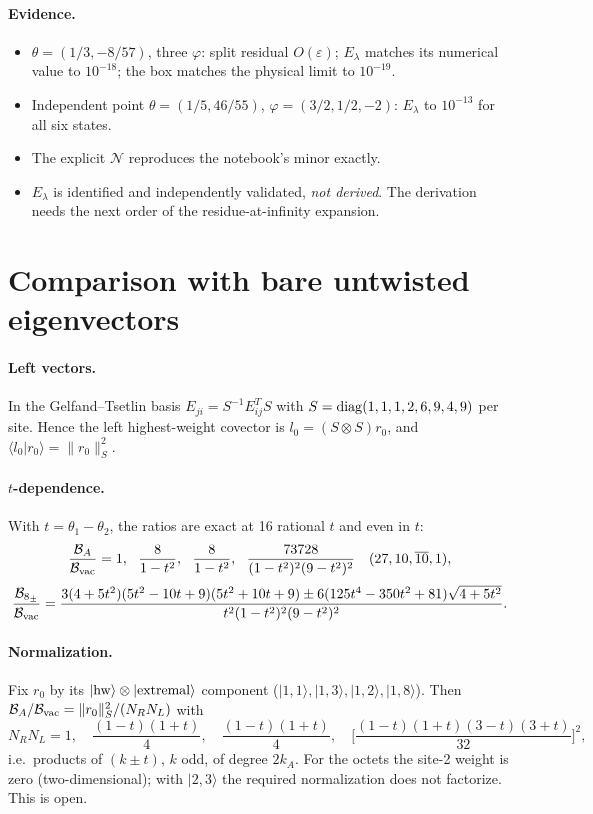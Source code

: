 \documentclass[11pt]{article}
\newcommand{\eps}{\varepsilon}
\newcommand{\vac}{{\rm vac}}
\begin{document}
\paragraph{Evidence.}
\begin{itemize}
\item $\theta=(1/3,-8/57)$, three $\varphi$: split residual $O(\eps)$; $E_\lambda$ matches its numerical value to $10^{-18}$; the box matches the physical limit to $10^{-19}$.
\item Independent point $\theta=(1/5,46/55)$, $\varphi=(3/2,1/2,-2)$: $E_\lambda$ to $10^{-13}$ for all six states.
\item The explicit $\mathcal N$ reproduces the notebook's minor exactly.
\item $E_\lambda$ is identified and independently validated, \emph{not derived}. The derivation needs the next order of the residue-at-infinity expansion.
\end{itemize}

\section{Comparison with bare untwisted eigenvectors}

\paragraph{Left vectors.} In the Gelfand--Tsetlin basis $E_{ji}=S^{-1}E_{ij}^TS$ with $S={\rm diag}(1,1,1,2,6,9,4,9)$ per site. Hence the left highest-weight covector is $l_0=(S\otimes S)r_0$, and $\langle l_0|r_0\rangle=\|r_0\|^2_S$.

\paragraph{$t$-dependence.} With $t=\theta_1-\theta_2$, the ratios are exact at 16 rational $t$ and even in $t$:
\begin{equation}
\frac{\mathcal B_A}{\mathcal B_\vac}=1,\ \ \frac{8}{1-t^2},\ \ \frac{8}{1-t^2},\ \ \frac{73728}{(1-t^2)^2(9-t^2)^2}\quad(27,10,\overline{10},1),
\end{equation}
\begin{equation}
\frac{\mathcal B_{8_\pm}}{\mathcal B_\vac}=\frac{3(4+5t^2)(5t^2-10t+9)(5t^2+10t+9)\pm6(125t^4-350t^2+81)\sqrt{4+5t^2}}{t^2(1-t^2)^2(9-t^2)^2}.
\end{equation}

\paragraph{Normalization.} Fix $r_0$ by its $|{\rm hw}\rangle\otimes|{\rm extremal}\rangle$ component
($|1,1\rangle,|1,3\rangle,|1,2\rangle,|1,8\rangle$). Then
$\mathcal B_A/\mathcal B_\vac=\|r_0\|^2_S/(N_RN_L)$ with
\begin{equation}
N_RN_L=1,\quad\frac{(1-t)(1+t)}4,\quad\frac{(1-t)(1+t)}4,\quad\Big[\frac{(1-t)(1+t)(3-t)(3+t)}{32}\Big]^2,
\end{equation}
i.e.\ products of $(k\pm t)$, $k$ odd, of degree $2k_A$.
For the octets the site-2 weight is zero (two-dimensional); with $|2,3\rangle$ the required normalization does not factorize. This is open.
\end{document}
